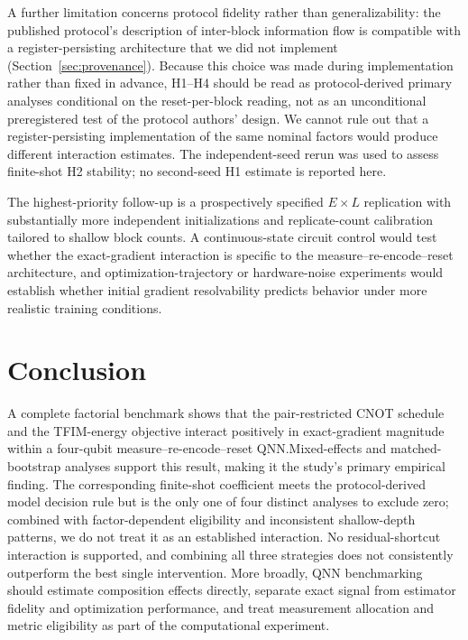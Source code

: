 \documentclass[pdflatex,sn-basic,Numbered]{sn-jnl}
\begin{document}
A further limitation concerns protocol fidelity rather than generalizability: the published protocol's description of inter-block information flow is compatible with a register-persisting architecture that we did not implement (Section~\ref{sec:provenance}). Because this choice was made during implementation rather than fixed in advance, H1--H4 should be read as protocol-derived primary analyses conditional on the reset-per-block reading, not as an unconditional preregistered test of the protocol authors' design. We cannot rule out that a register-persisting implementation of the same nominal factors would produce different interaction estimates. The independent-seed rerun was used to assess finite-shot H2 stability; no second-seed H1 estimate is reported here.

The highest-priority follow-up is a prospectively specified $E\times L$ replication with substantially more independent initializations and replicate-count calibration tailored to shallow block counts. A continuous-state circuit control would test whether the exact-gradient interaction is specific to the measure--re-encode--reset architecture, and optimization-trajectory or hardware-noise experiments would establish whether initial gradient resolvability predicts behavior under more realistic training conditions.

\section{Conclusion}\label{sec:conclusion}

A complete factorial benchmark shows that the pair-restricted CNOT schedule and the TFIM-energy objective interact positively in exact-gradient magnitude within a four-qubit measure--re-encode--reset QNN.\@ Mixed-effects and matched-bootstrap analyses support this result, making it the study's primary empirical finding. The corresponding finite-shot coefficient meets the protocol-derived model decision rule but is the only one of four distinct analyses to exclude zero; combined with factor-dependent eligibility and inconsistent shallow-depth patterns, we do not treat it as an established interaction. No residual-shortcut interaction is supported, and combining all three strategies does not consistently outperform the best single intervention. More broadly, QNN benchmarking should estimate composition effects directly, separate exact signal from estimator fidelity and optimization performance, and treat measurement allocation and metric eligibility as part of the computational experiment.
\end{document}
